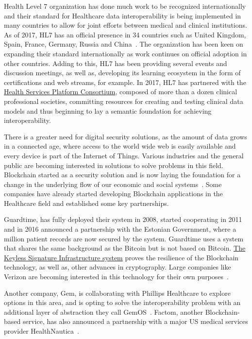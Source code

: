 Health Level 7 organization has done much work to be recognized internationally
and their standard for Healthcare data interoperability is being implemented in
many countries to allow for joint efforts between medical and clinical
institutions.  As of 2017, HL7 has an official presence in 34 countries such as
United Kingdom, Spain, France, Germany, Russia and China~\cite{HL7Anual2016}.
The organization has been keen on expanding their standard internationally as
work continues on official adoption in other countries. Adding to this, HL7 has
been providing several events and discussion meetings, as well as, developing
its learning ecosystem in the form of certifications and web streams, for
example. In 2017, HL7 has partnered with the
\href{https://www.hspconsortium.org/}{Health Services Platform Consortium},
composed of more than a dozen clinical professional societies, committing
resources for creating and testing clinical data models and thus beginning to
lay a semantic foundation for achieving interoperability.

There is a greater need for digital security solutions, as the amount of data
grows in a connected age, where access to the world wide web is easily
available and every device is part of the Internet of Things. Various
industries and the general public are becoming interested in solutions to solve
problems in this field. Blockchain started as a security solution and is now
laying the foundation for a change in the underlying flow of our economic and
social systems~\cite{Zago2018,Marr2018,Long2018}. Some companies have already
started developing Blockchain applications in the Healthcare field and
established some key partnerships.

Guardtime, has fully deployed their system in 2008, started cooperating in 2011
and in 2016 announced a partnership with the Estonian Government, where a
million patient records are now secured by the system. Guardtime uses a system
that shares the same background as the Bitcoin but is not based on Bitcoin.
\href{https://guardtime.com/technology}{The Keyless Signature Infrastructure
	system} proves the resilience of the Blockchain technology, as well as, other
advances in cryptography. Large companies like Verizon are becoming interested
in this technology for their own
purposes~\cite{GuardTime2018,EstonianGovernmentGuardTime2016}.

Another company, Gem, is collaborating with Phillips Healthcare to explore
options in this area\cite{philips2016}, and is opting to solve the
interoperability problem with an additional layer of abstraction they call
GemOS~\cite{gemOS2018}. Factom, another Blockchain-based service, has also
announced a partnership with a major US medical services provider
HealthNautica~\cite{BlockchainCompHealth2017,FactomPartnership2017}.


